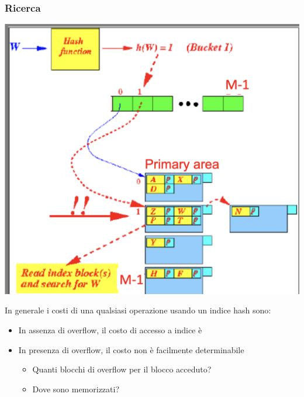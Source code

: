 \documentclass[12pt, a4paper]{report}
\begin{document}
    \subsubsection{Ricerca}
    \begin{center}
        \includegraphics[scale=0.4]{Appunti Latex/Immagini/indicihashricercatrabocco.png}
    \end{center}
    In generale i costi di una qualsiasi operazione usando un indice hash sono:
    \begin{itemize}
        \item In assenza di overflow, il costo di accesso a indice è 
        \item In presenza di overflow, il costo non è facilmente determinabile \begin{itemize}
            \item Quanti blocchi di overflow per il blocco acceduto?
            \item Dove sono memorizzati?
        \end{itemize}
    \end{itemize}
\end{document}
